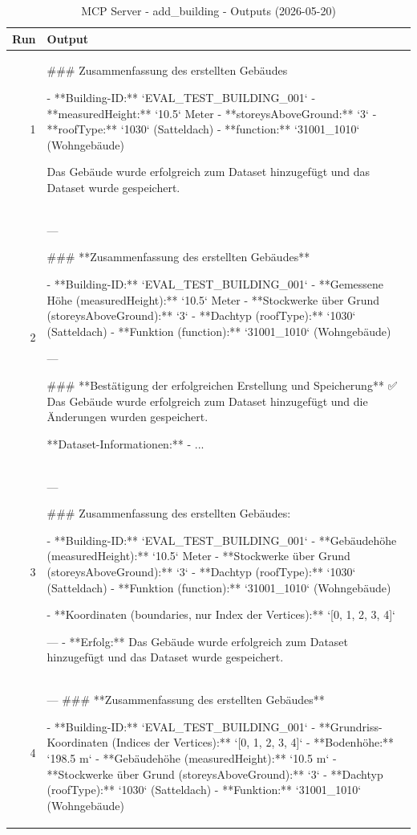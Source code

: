\documentclass[a4paper,11pt]{article}
\begin{document}
\begin{table}[ht]
\centering
\scriptsize
\caption{MCP Server - add\_building - Outputs (2026-05-20)}
\label{tab:mcp\_add\_building\_outputs\_2026-05-20}
\begin{tabular}{r p{12cm}}
\hline
Run & Output \\
\hline
1 & \#\#\# Zusammenfassung des erstellten Gebäudes

- **Building-ID:** `EVAL\_TEST\_BUILDING\_001`
- **measuredHeight:** `10.5` Meter
- **storeysAboveGround:** `3`
- **roofType:** `1030` (Satteldach)
- **function:** `31001\_1010` (Wohngebäude)

Das Gebäude wurde erfolgreich zum Dataset hinzugefügt und das Dataset wurde gespeichert. \\
2 & ---

\#\#\# **Zusammenfassung des erstellten Gebäudes**

- **Building-ID:** `EVAL\_TEST\_BUILDING\_001`
- **Gemessene Höhe (measuredHeight):** `10.5` Meter
- **Stockwerke über Grund (storeysAboveGround):** `3`
- **Dachtyp (roofType):** `1030` (Satteldach)
- **Funktion (function):** `31001\_1010` (Wohngebäude)

---

\#\#\# **Bestätigung der erfolgreichen Erstellung und Speicherung**
✅ Das Gebäude wurde erfolgreich zum Dataset hinzugefügt und die Änderungen wurden gespeichert.

**Dataset-Informationen:**
- ... \\
3 & ---

\#\#\# Zusammenfassung des erstellten Gebäudes:

- **Building-ID:** `EVAL\_TEST\_BUILDING\_001`
- **Gebäudehöhe (measuredHeight):** `10.5` Meter
- **Stockwerke über Grund (storeysAboveGround):** `3`
- **Dachtyp (roofType):** `1030` (Satteldach)
- **Funktion (function):** `31001\_1010` (Wohngebäude)

- **Koordinaten (boundaries, nur Index der Vertices):**
  `[0, 1, 2, 3, 4]`

---
- **Erfolg:** Das Gebäude wurde erfolgreich zum Dataset hinzugefügt und das Dataset wurde gespeichert. \\
4 & ---
\#\#\# **Zusammenfassung des erstellten Gebäudes**

- **Building-ID:** `EVAL\_TEST\_BUILDING\_001`
- **Grundriss-Koordinaten (Indices der Vertices):** `[0, 1, 2, 3, 4]`
- **Bodenhöhe:** `198.5 m`
- **Gebäudehöhe (measuredHeight):** `10.5 m`
- **Stockwerke über Grund (storeysAboveGround):** `3`
- **Dachtyp (roofType):** `1030` (Satteldach)
- **Funktion:** `31001\_1010` (Wohngebäude)


\end{tabular}
\end{table}
\end{document}
